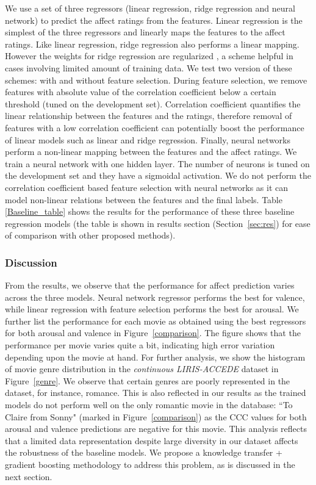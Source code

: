 \documentclass{article}
\begin{document}
We use a set of three regressors (linear regression, ridge regression and neural network) to predict the affect ratings from the features. 
Linear regression \cite{bishop2006pattern} is the simplest of the three regressors and linearly maps the features to the affect ratings.
Like linear regression, ridge regression \cite{bishop2006pattern} also performs a linear mapping.
However the weights for ridge regression are regularized \cite{bishop2006pattern}, a scheme helpful in cases involving limited amount of training data.
We test two version of these schemes: with and without feature selection.
During feature selection, we remove features with absolute value of the correlation coefficient below a certain threshold (tuned on the development set).
Correlation coefficient quantifies the linear relationship between the features and the ratings, therefore removal of features with a low correlation coefficient can potentially boost the performance of linear models such as linear and ridge regression. 
Finally, neural networks \cite{bishop2006pattern} perform a non-linear mapping between the features and the affect ratings. 
We train a neural network with one hidden layer.
The number of neurons is tuned on the development set and they have a sigmoidal activation.
We do not perform the correlation coefficient based feature selection with neural networks as it can model non-linear relations between the features and the final labels. 
Table \ref{Baseline_table} shows the results for the performance of these three baseline regression models (the table is shown in results section (Section~\ref{sec:res}) for ease of comparison with other proposed methods). 


\subsubsection{Discussion} From the results, we observe that the performance for affect prediction varies across the three models.
Neural network regressor performs the best for valence, while linear regression with feature selection performs the best for arousal.
We further list the performance for each movie as obtained using the best regressors for both arousal and valence in Figure~\ref{comparison}. 
The figure shows that the performance per movie varies quite a bit, indicating high error variation depending upon the movie at hand. 
For further analysis, we show the histogram of movie genre distribution in the {\it continuous LIRIS-ACCEDE} dataset in Figure~\ref{genre}.
We observe that certain genres are poorly represented in the dataset, for instance, romance.
This is also reflected in our results as the trained models do not perform well on the only romantic movie in the database: ``To Claire from Sonny" (marked in Figure~\ref{comparison}) as the CCC values for both arousal and valence predictions are negative for this movie. 
This analysis reflects that a limited data representation despite large diversity in our dataset affects the robustness of the baseline models.
We propose a knowledge transfer + gradient boosting methodology to address this problem, as is discussed in the next section.
\end{document}

